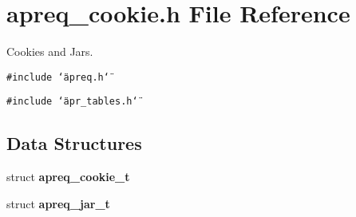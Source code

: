 \section{apreq\_\-cookie.h File Reference}
\label{apreq__cookie_8h}
Cookies and Jars. 


{\tt \#include \char`\"{}apreq.h\char`\"{}}\par
{\tt \#include \char`\"{}apr\_\-tables.h\char`\"{}}\par
\subsection*{Data Structures}
\begin{CompactItemize}
\item 
struct {\bf apreq\_\-cookie\_\-t}
\item 
struct {\bf apreq\_\-jar\_\-t}
\end{CompactItemize}
